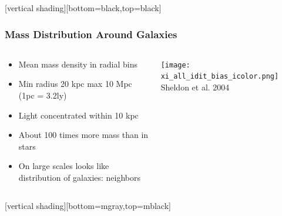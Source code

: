\documentclass{beamer}
\begin{document}
{
    [vertical shading][bottom=black,top=black]


    \frame
    {
        \frametitle{Mass Distribution Around Galaxies}

        \begin{columns}
            \begin{column}{0.5\textwidth}    
                \begin{itemize}

                    \item Mean mass density in radial bins

                    \item Min radius 20 kpc max 10 Mpc {\color{gold} (1pc = 3.2ly)}

                    \item Light concentrated within 10 kpc

                    \item About 100 times more mass than in stars

                    \item On large scales looks like distribution of galaxies:
                        neighbors


                \end{itemize}
            \end{column}
            \begin{column}{0.5\textwidth}
                \begin{center}
                    \texttt{[image: xi\_all\_idit\_bias\_icolor.png]}
                    \newline
                    {\color{gold}Sheldon et al. 2004}
                \end{center}
            \end{column}
        \end{columns}
    }

    [vertical shading][bottom=mgray,top=mblack]
}
\end{document}
